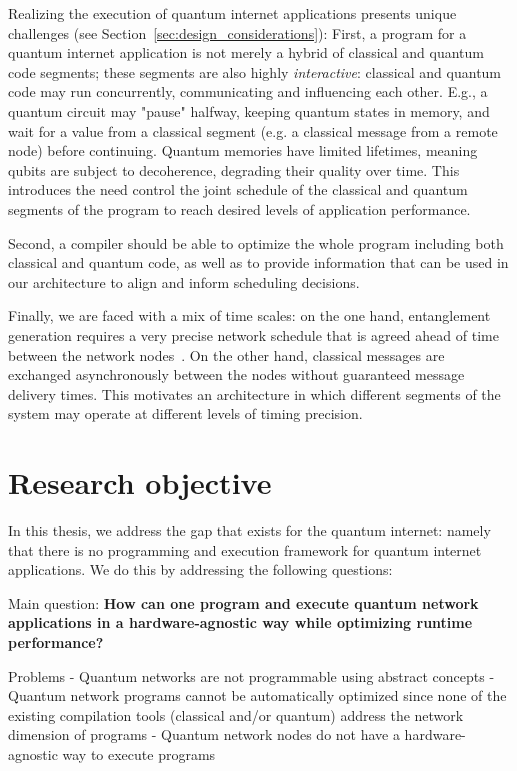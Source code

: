 
Realizing the execution of quantum internet applications presents unique challenges (see Section~\ref{sec:design_considerations}): 
First, a program for a quantum internet application is not merely a hybrid of classical and quantum code segments; these segments are also highly \textit{interactive}: classical and quantum code may run concurrently, communicating and influencing each other.
E.g., a quantum circuit may "pause" halfway, keeping quantum states in memory, and wait for a value from a classical segment (e.g. a classical message from a remote node) before continuing.
Quantum memories have limited lifetimes, meaning qubits are subject to decoherence, degrading their quality over time. This introduces the need 
control the joint schedule of the classical and quantum segments of the program to reach desired levels of application performance.

Second, a compiler should be able to optimize the whole program including both classical and quantum code, as well as to provide information that can be used in our architecture to align and inform scheduling decisions. 

Finally, we are faced with a mix of time scales:
on the one hand, entanglement generation requires a very precise network schedule that is agreed ahead of time between the network nodes~\cite{dahlberg2019link}. On the other hand, classical messages are exchanged asynchronously between the nodes without guaranteed message delivery times. This motivates an architecture in which different segments of the system may operate at different levels of timing precision. 

\section{Research objective}
In this thesis, we address the gap that exists for the quantum internet: namely that there is no programming and execution framework for quantum internet applications.
We do this by addressing the following questions:

Main question: \textbf{How can one program and execute quantum network applications in a hardware-agnostic way while optimizing runtime performance?}

Problems
- Quantum networks are not programmable using abstract concepts
- Quantum network programs cannot be automatically optimized since none of the existing compilation tools (classical and/or quantum) address the network dimension of programs
- Quantum network nodes do not have a hardware-agnostic way to execute programs

